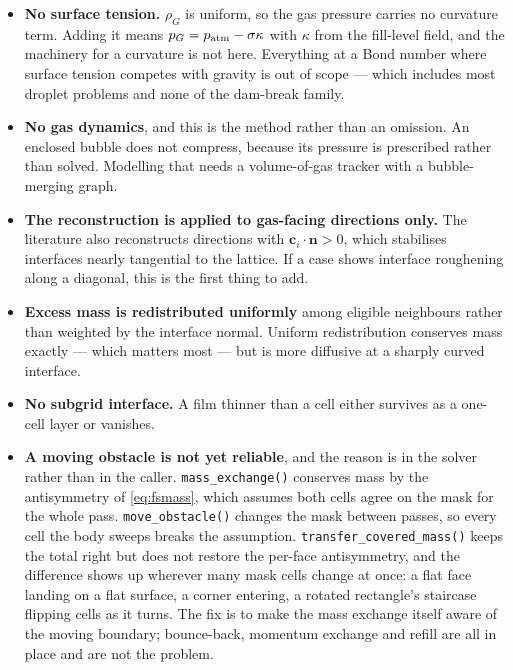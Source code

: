 \documentclass[11pt,a4paper]{article}
\newcommand{\code}[1]{\texttt{\small #1}}
\newcommand{\ci}{\bm{c}_i}
\newcommand{\nn}{\bm{n}}
\begin{document}
\begin{itemize}[leftmargin=1.4em,itemsep=3pt]
\item \textbf{No surface tension.} $\rho_G$ is uniform, so the gas pressure
  carries no curvature term. Adding it means $p_G = p_{\rm atm} - \sigma\kappa$
  with $\kappa$ from the fill-level field, and the machinery for a curvature is
  not here. Everything at a Bond number where surface tension competes with
  gravity is out of scope --- which includes most droplet problems and none of
  the dam-break family.
\item \textbf{No gas dynamics}, and this is the method rather than an omission.
  An enclosed bubble does not compress, because its pressure is prescribed
  rather than solved. Modelling that needs a volume-of-gas tracker with a
  bubble-merging graph.
\item \textbf{The reconstruction is applied to gas-facing directions only.} The
  literature also reconstructs directions with $\ci \cdot \nn > 0$, which
  stabilises interfaces nearly tangential to the lattice. If a case shows
  interface roughening along a diagonal, this is the first thing to add.
\item \textbf{Excess mass is redistributed uniformly} among eligible neighbours
  rather than weighted by the interface normal. Uniform redistribution conserves
  mass exactly --- which matters most --- but is more diffusive at a sharply
  curved interface.
\item \textbf{No subgrid interface.} A film thinner than a cell either survives
  as a one-cell layer or vanishes.
\item \textbf{A moving obstacle is not yet reliable}, and the reason is in the
  solver rather than in the caller. \code{mass\_exchange()} conserves mass by
  the antisymmetry of \eqref{eq:fsmass}, which assumes both cells agree on the
  mask for the whole pass. \code{move\_obstacle()} changes the mask between
  passes, so every cell the body sweeps breaks the assumption.
  \code{transfer\_covered\_mass()} keeps the total right but does not restore
  the per-face antisymmetry, and the difference shows up wherever many mask
  cells change at once: a flat face landing on a flat surface, a corner
  entering, a rotated rectangle's staircase flipping cells as it turns. The fix
  is to make the mass exchange itself aware of the moving boundary; bounce-back,
  momentum exchange and refill are all in place and are not the problem.
\end{itemize}

\end{document}

